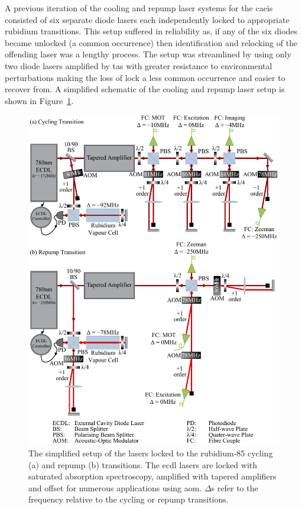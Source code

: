 A previous iteration of the cooling and repump laser systems for the \gls{caeis} consisted of six separate diode lasers each independently locked to appropriate rubidium transitions.
This setup suffered in reliability as, if any of the six diodes became unlocked (a common occurrence) then identification and relocking of the offending laser was a lengthy process.
The setup was streamlined by using only two diode lasers amplified by \glspl{ta} with greater resistance to environmental perturbations making the loss of lock a less common occurrence and easier to recover from.
A simplified schematic of the cooling and repump laser setup is shown in Figure~\ref{figure:laser_setup}.

\begin{figure}
    \center
    \includegraphics{part2/Figs/laser_setup.pdf}
    \caption[Simplified schematic of the laser setup for the \gls{caeis}.]{The simplified setup of the lasers locked to the rubidium-85 cycling (a) and repump (b) transitions.
    The \gls{ecdl} lasers are locked with saturated absorption spectroscopy, amplified with tapered amplifiers and offset for numerous applications using \gls{aom}.
    $\Delta$s refer to the frequency relative to the cycling or repump transitions.}
    \label{figure:laser_setup}
\end{figure}

